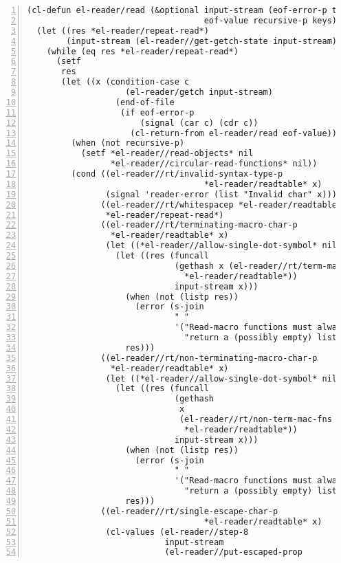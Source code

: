 \documentclass[a4paper,10pt,twoside]{report}
\begin{document}
\begin{lstlisting}[style=lispcode,label={code:read-algo},caption={Code for the
    reader algorithm.},numbers=left]
(cl-defun el-reader/read (&optional input-stream (eof-error-p t)
                                    eof-value recursive-p keys)
  (let ((res *el-reader/repeat-read*)
        (input-stream (el-reader//get-getch-state input-stream)))
    (while (eq res *el-reader/repeat-read*)
      (setf
       res
       (let ((x (condition-case c
                    (el-reader/getch input-stream)
                  (end-of-file
                   (if eof-error-p
                       (signal (car c) (cdr c))
                     (cl-return-from el-reader/read eof-value))))))
         (when (not recursive-p)
           (setf *el-reader//read-objects* nil
                 *el-reader//circular-read-functions* nil))
         (cond ((el-reader//rt/invalid-syntax-type-p
                                    *el-reader/readtable* x)
                (signal 'reader-error (list "Invalid char" x)))
               ((el-reader//rt/whitespacep *el-reader/readtable* x)
                *el-reader/repeat-read*)
               ((el-reader//rt/terminating-macro-char-p
                 *el-reader/readtable* x)
                (let ((*el-reader//allow-single-dot-symbol* nil))
                  (let ((res (funcall
                              (gethash x (el-reader//rt/term-mac-fns
                                *el-reader/readtable*))
                              input-stream x)))
                    (when (not (listp res))
                      (error (s-join
                              " "
                              '("Read-macro functions must always"
                                "return a (possibly empty) list."))))
                    res)))
               ((el-reader//rt/non-terminating-macro-char-p
                 *el-reader/readtable* x)
                (let ((*el-reader//allow-single-dot-symbol* nil))
                  (let ((res (funcall
                              (gethash
                               x
                               (el-reader//rt/non-term-mac-fns
                                *el-reader/readtable*))
                              input-stream x)))
                    (when (not (listp res))
                      (error (s-join
                              " "
                              '("Read-macro functions must always"
                                "return a (possibly empty) list."))))
                    res)))
               ((el-reader//rt/single-escape-char-p
                                    *el-reader/readtable* x)
                (cl-values (el-reader//step-8
                            input-stream
                            (el-reader//put-escaped-prop

\end{lstlisting}
\end{document}
